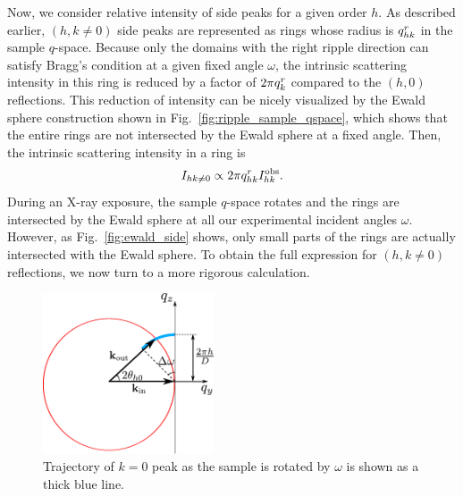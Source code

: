 Now, we consider relative intensity of side peaks for a given order $h$.
As described earlier, $(h, k\neq 0)$ side peaks are represented as
rings whose radius is $q_{hk}^r$ in the sample $q$-space. 
Because only the domains with the right ripple direction can satisfy Bragg's condition at a given fixed
angle $\omega$, the intrinsic scattering intensity in this ring is reduced by 
a factor of $2\pi q_{k}^r$ compared to the $(h, 0)$ reflections.
This reduction of intensity can be nicely visualized by the Ewald sphere construction
shown in Fig.~\ref{fig:ripple_sample_qspace},
which shows that the entire rings are not intersected by the Ewald sphere at 
a fixed angle. Then, the intrinsic scattering intensity in a ring is
\begin{equation}
  I_{hk\neq 0} \propto 2\pi q_{hk}^r I_{hk}^\textrm{obs}. \label{eq:side_ewald}
\end{equation}
During an X-ray exposure, the sample $q$-space rotates and 
the rings are intersected by the Ewald sphere at all our experimental incident angles $\omega$.
However, as Fig.~\ref{fig:ewald_side} shows, only small parts of the rings
are actually intersected with the Ewald sphere.  
To obtain the full expression for $(h,k\neq 0)$ reflections, we now turn
to a more rigorous calculation.

\begin{figure}[htbp]
  \centering
  \includegraphics[width=0.45\textwidth]{figures/ripple/analysis/ewald_main}
  \caption[Trajectory of $k=0$ peak as the sample is rotated by $\omega$ is 
  shown as a thick blue line]
  {Trajectory of $k=0$ peak as the sample is rotated by $\omega$ is 
  shown as a thick blue line.}
  \label{fig:ewald_main}
\end{figure}

